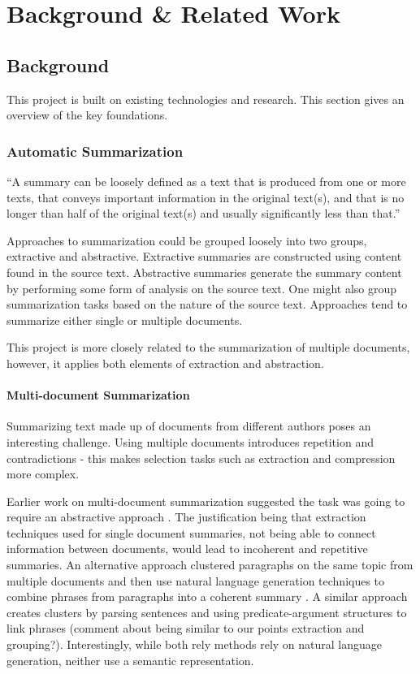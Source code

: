 \chapter{Background \& Related Work\label{chap:background-related}}
  \section{Background}
    This project is built on existing technologies and research. This section gives an overview of the key foundations.

    \subsection{Automatic Summarization}
      ``A summary can be loosely defined as a text that is produced from one or more texts, that conveys important information in the original text(s), and that is no longer than half of the original text(s) and usually significantly less than that.'' \cite{radev2002introduction}

      Approaches to summarization could be grouped loosely into two groups, extractive and abstractive. Extractive summaries are constructed using content found in the source text. Abstractive summaries generate the summary content by performing some form of analysis on the source text. One might also group summarization tasks based on the nature of the source text. Approaches tend to summarize either single or multiple documents.

      This project is more closely related to the summarization of multiple documents, however, it applies both elements of extraction and abstraction.

      \subsubsection{Multi-document Summarization}
        Summarizing text made up of documents from different authors poses an interesting challenge. Using multiple documents introduces repetition and contradictions - this makes selection tasks such as extraction and compression more complex.

        Earlier work on multi-document summarization suggested the task was going to require an abstractive approach \cite{McKeown1999TMS315149315355}. The justification being that extraction techniques used for single document summaries, not being able to connect information between documents, would lead to incoherent and repetitive summaries. An alternative approach clustered paragraphs on the same topic from multiple documents and then use natural language generation techniques to combine phrases from paragraphs into a coherent summary \cite{McKeown1999TMS315149315355}. A similar approach creates clusters by parsing sentences and using predicate-argument structures to link phrases \cite{barzilay1999information} (comment about being similar to our points extraction and grouping?). Interestingly, while both rely methods rely on natural language generation, neither use a semantic representation.

